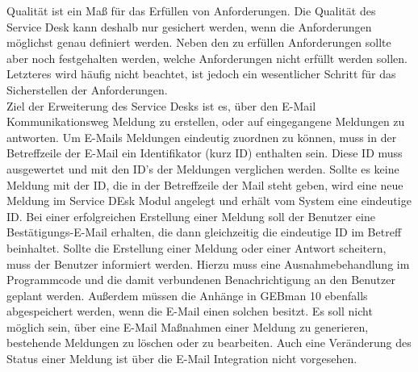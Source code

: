\noindent
Qualität ist ein Maß für das Erfüllen von Anforderungen. Die Qualität des Service Desk kann deshalb nur gesichert werden, wenn die Anforderungen möglichst genau definiert werden. Neben den zu erfüllen Anforderungen sollte aber noch festgehalten werden, welche Anforderungen nicht erfüllt werden sollen. Letzteres wird häufig nicht beachtet, ist jedoch ein wesentlicher Schritt für das Sicherstellen der Anforderungen.\\
\noindent
Ziel der Erweiterung des Service Desks ist es, über den E-Mail Kommunikationsweg Meldung zu erstellen, oder auf eingegangene Meldungen zu antworten. Um E-Mails Meldungen eindeutig zuordnen zu können, muss in der Betreffzeile der E-Mail ein Identifikator (kurz ID) enthalten sein. Diese ID muss ausgewertet und mit den ID's der Meldungen verglichen werden. Sollte es keine Meldung mit der ID, die in der Betreffzeile der Mail steht geben, wird eine neue Meldung im Service DEsk Modul angelegt und erhält vom System eine eindeutige ID. Bei einer erfolgreichen Erstellung einer Meldung soll der Benutzer eine Bestätigungs-E-Mail erhalten, die dann gleichzeitig die eindeutige ID im Betreff beinhaltet. Sollte die Erstellung einer Meldung oder einer Antwort scheitern, muss der Benutzer informiert werden. Hierzu muss eine Ausnahmebehandlung im Programmcode und die damit verbundenen Benachrichtigung an den Benutzer geplant werden. Außerdem müssen die Anhänge in GEBman 10 ebenfalls abgespeichert werden, wenn die E-Mail einen solchen besitzt. \newline
Es soll nicht möglich sein, über eine E-Mail Maßnahmen einer Meldung zu generieren, bestehende Meldungen zu löschen oder zu bearbeiten. Auch eine Veränderung des Status einer Meldung ist über die E-Mail Integration nicht vorgesehen.

